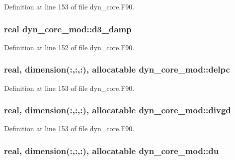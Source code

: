 Definition at line 153 of file dyn\-\_\-core.\-F90.

\subsubsection[{d3\-\_\-damp}]{\setlength{\rightskip}{0pt plus 5cm}real dyn\-\_\-core\-\_\-mod\-::d3\-\_\-damp\hspace{0.3cm}{\ttfamily [private]}}\label{classdyn__core__mod_ab65a8777b1bd81dcfc1b7cfed5a974c5}


Definition at line 152 of file dyn\-\_\-core.\-F90.

\subsubsection[{delpc}]{\setlength{\rightskip}{0pt plus 5cm}real, dimension(\-:,\-:,\-:), allocatable dyn\-\_\-core\-\_\-mod\-::delpc\hspace{0.3cm}{\ttfamily [private]}}\label{classdyn__core__mod_aa4417385939b0cafbeadaa424ed3c914}


Definition at line 153 of file dyn\-\_\-core.\-F90.

\subsubsection[{divgd}]{\setlength{\rightskip}{0pt plus 5cm}real, dimension(\-:,\-:,\-:), allocatable dyn\-\_\-core\-\_\-mod\-::divgd\hspace{0.3cm}{\ttfamily [private]}}\label{classdyn__core__mod_a7b77379648e83296d79064ebbc7928e6}


Definition at line 153 of file dyn\-\_\-core.\-F90.

\subsubsection[{du}]{\setlength{\rightskip}{0pt plus 5cm}real, dimension(\-:,\-:,\-:), allocatable dyn\-\_\-core\-\_\-mod\-::du\hspace{0.3cm}{\ttfamily [private]}}\label{classdyn__core__mod_ac9c0730e7747e9cb1f3be62a5565672a}


